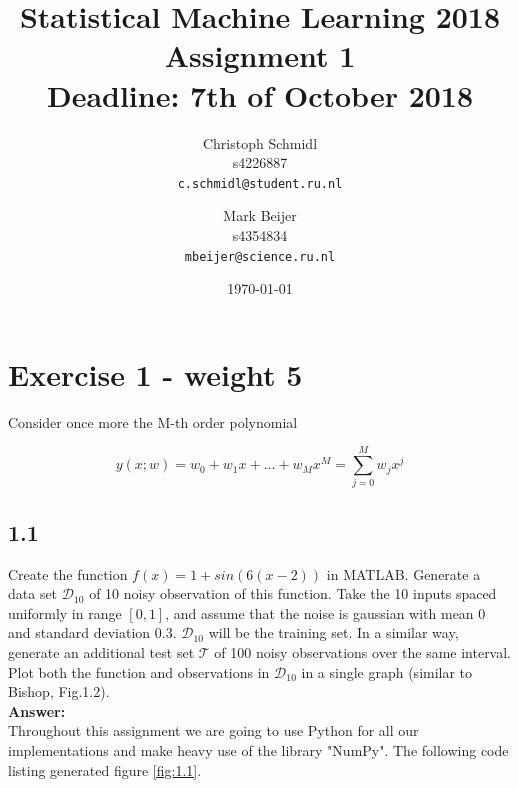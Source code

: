 \documentclass[a4paper]{article}
\title{Statistical Machine Learning 2018\\Assignment 1\\Deadline: 7th of October 2018}
\author{
  Christoph Schmidl\\ s4226887\\      \texttt{c.schmidl@student.ru.nl}
  \and
  Mark Beijer\\ s4354834\\     \texttt{mbeijer@science.ru.nl}
}
\date{\today}
\begin{document}
\maketitle


\section*{Exercise 1 - weight 5}

Consider once more the M-th order polynomial

\begin{equation}
	y(x;w) = w_0 + w_1x + ... + w_Mx^M = \sum_{j = 0}^M w_jx^j
\end{equation}

\subsection*{1.1}

Create the function $f(x) = 1 + sin(6(x-2))$ in MATLAB. Generate a data set $\mathcal{D}_{10}$ of 10 noisy observation of this function. Take the 10 inputs spaced uniformly in range $[0,1]$, and assume that the noise is gaussian with mean 0 and standard deviation 0.3. $\mathcal{D}_{10}$ will be the training set. In a similar way, generate an additional test set $\mathcal{T}$ of 100 noisy observations over the same interval. Plot both the function and observations in $\mathcal{D}_{10}$ in a single graph (similar to Bishop, Fig.1.2).\\

\textbf{Answer:}\\

Throughout this assignment we are going to use Python for all our implementations and make heavy use of the library "NumPy". The following code listing generated figure \ref{fig:1.1}.
\end{document}
